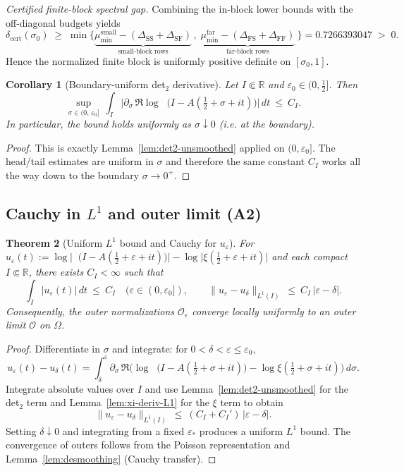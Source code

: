 \documentclass[11pt]{article}
\newtheorem{theorem}{Theorem}
\newtheorem{corollary}[theorem]{Corollary}
\theoremstyle{definition}
\theoremstyle{remark}
\newcommand{\R}{\mathbb{R}}
\DeclareMathOperator{\dettwo}{det_2}
\begin{document}
\noindent\emph{Certified finite-block spectral gap.}
Combining the in-block lower bounds with the off-diagonal budgets yields
\[
\delta_{\mathrm{cert}}(\sigma_0)\;\ge\;
\min\Big\{
\underbrace{\mu_{\min}^{\mathrm{small}}-(\Delta_{\mathrm{SS}}+\Delta_{\mathrm{SF}})}_{\text{small-block rows}}\,,\;
\underbrace{\mu_{\min}^{\mathrm{far}}-(\Delta_{\mathrm{FS}}+\Delta_{\mathrm{FF}})}_{\text{far-block rows}}\
\Big\}
=0.7266393047\;>\;0.
\]
Hence the normalized finite block is uniformly positive definite on \([\sigma_0,1]\).

\begin{corollary}[Boundary-uniform det$_2$ derivative]\label{cor:det2-boundary}
Let $I\Subset\R$ and $\varepsilon_0\in(0,\tfrac12]$. Then
\[
  \sup_{\sigma\in(0,\,\varepsilon_0]}\ \int_I\Big|\partial_\sigma\,\Re\log\dettwo\big(I-A(\tfrac12+\sigma+it)\big)\Big|\,dt\ \le\ C_I.
\]
In particular, the bound holds uniformly as $\sigma\downarrow 0$ (i.e. at the boundary).
\end{corollary}
\begin{proof}
This is exactly Lemma~\ref{lem:det2-unsmoothed} applied on $(0,\varepsilon_0]$. The head/tail estimates are uniform in $\sigma$ and therefore the same constant $C_I$ works all the way down to the boundary $\sigma\to 0^+$.
\end{proof}

\subsection*{Cauchy in $L^1$ and outer limit (A2)}
\begin{theorem}[Uniform $L^1$ bound and Cauchy for $u_\varepsilon$]\label{thm:unsmoothed-Cauchy}
For $u_\varepsilon(t):=\log\Big|\dettwo\!\big(I\! -\!A(\tfrac12\!+\varepsilon\!+\!it)\big)\Big|\! -\!\log\big|\xi(\tfrac12\!+\varepsilon\!+\!it)\big|$ and each compact $I\Subset\R$, there exists $C_I<\infty$ such that
\[
 \int_I |u_\varepsilon(t)|\,dt\ \le\ C_I\quad (\varepsilon\in(0,\varepsilon_0]),\qquad
 \|u_\varepsilon-u_\delta\|_{L^1(I)}\ \le\ C_I\,|\varepsilon-\delta|.
\]
Consequently, the outer normalizations $\mathcal O_\varepsilon$ converge locally uniformly to an outer limit $\mathcal O$ on $\Omega$.
\end{theorem}
\begin{proof}
Differentiate in $\sigma$ and integrate: for $0<\delta<\varepsilon\le\varepsilon_0$,
\[
 u_\varepsilon(t)-u_\delta(t)=\int_\delta^{\varepsilon} \partial_\sigma\,\Re\Big(\log\dettwo\big(I\! -\!A(\tfrac12\!+\sigma\!+\!it)\big)-\log\xi(\tfrac12\!+\sigma\!+\!it)\Big)\,d\sigma.
\]
Integrate absolute values over $I$ and use Lemma~\ref{lem:det2-unsmoothed} for the det$_2$ term and Lemma~\ref{lem:xi-deriv-L1} for the $\xi$ term to obtain
\[
 \|u_\varepsilon-u_\delta\|_{L^1(I)}\ \le\ (C_I+C_I')\,|\varepsilon-\delta|.
\]
Setting $\delta\downarrow 0$ and integrating from a fixed $\varepsilon_*$ produces a uniform $L^1$ bound. The convergence of outers follows from the Poisson representation and Lemma~\ref{lem:desmoothing} (Cauchy transfer). 
\end{proof}
\end{document}
